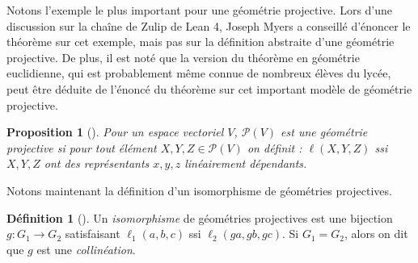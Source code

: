 \documentclass[12pt, oneside]{memoir}
\newtheorem{prop}{Proposition}
\theoremstyle{definition}
\newtheorem{defn}{Définition}
\newcommand{\proj}{\boldsymbol{\mathscr{P}}}
\newcommand*{\DashedArrow}[1][]{\mathbin{\tikz [baseline=-0.25ex,-latex, dashed,#1] \draw [#1] (0pt,0.5ex) -- (1.3em,0.5ex);}}%
\newcommand{\partialto}{\DashedArrow[->,dash pattern=on 4pt off 2pt]}
\DeclareMathOperator{\kernel}{Ker}
\DeclareMathOperator{\domain}{Dom}
\begin{document}
Notons l'exemple le plus important pour une géométrie projective. Lors
d'une discussion sur la chaîne de Zulip de Lean 4, Joseph Myers a
conseillé d'énoncer le théorème sur cet exemple, mais pas sur la
définition abstraite d'une géométrie projective. De plus, il est noté
que la version du théorème en géométrie euclidienne, qui est
probablement même connue de nombreux élèves du lycée, peut être
déduite de l'énoncé du théorème sur cet important modèle de géométrie
projective.
\begin{prop}[{\cite[27]{ff00}}]
  Pour un espace vectoriel $V$, $\proj(V)$ est une géométrie
  projective si pour tout élément $X, Y, Z \in \proj(V)$ on définit :
  $\ell(X,Y,Z)$ ssi $X, Y, Z$ ont des représentants $x, y, z$
  linéairement dépendants.
\end{prop}
Notons maintenant la définition d'un isomorphisme de géométries
projectives.
\begin{defn}[{\cite[27]{ff00}}]
  Un \textit{isomorphisme} de géométries projectives est une bijection
  $g: G_1 \to G_2$ satisfaisant $\ell_1(a,b,c)$ ssi
  $\ell_2(ga,gb,gc)$. Si $G_1 = G_2$, alors on dit que $g$ est une
  \textit{collinéation}.
\end{defn}
\end{document}
